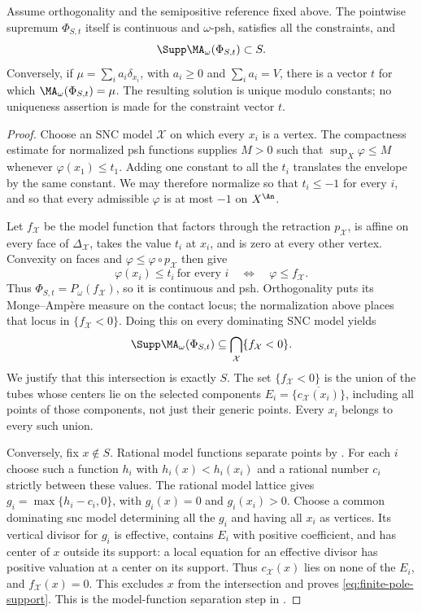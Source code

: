 \begin{proposition}
\label{prop:finite-pole-envelope}
Assume orthogonality and the semipositive reference fixed above.
The pointwise supremum $\Phi_{S,t}$ itself is continuous and
$\omega$-psh, satisfies all the constraints, and
\begin{equation}
                         \Supp\MA_\omega(\Phi_{S,t})\subset S.
\label{eq:finite-pole-support}
\end{equation}
Conversely, if
$\mu=\sum_i a_i\delta_{x_i}$, with $a_i\geq0$ and
$\sum_i a_i=V$, there is a vector $t$ for which
$\MA_\omega(\Phi_{S,t})=\mu$.  The resulting solution is unique modulo
constants; no uniqueness assertion is made for the constraint vector
$t$.
\end{proposition}

\begin{proof}
Choose an SNC model $\mathcal X$ on which every $x_i$ is a vertex.
The compactness estimate for normalized psh functions supplies $M>0$
such that $\sup_X\varphi\leq M$ whenever
$\varphi(x_1)\leq t_1$.  Adding one constant to all the $t_i$ translates
the envelope by the same constant.  We may therefore normalize so that
$t_i\leq-1$ for every $i$, and so that every admissible $\varphi$ is
at most $-1$ on $X^{\An}$.

Let $f_{\mathcal X}$ be the model function that factors through the
retraction $p_{\mathcal X}$, is affine on every face of
$\Delta_{\mathcal X}$, takes the value $t_i$ at $x_i$, and is zero
at every other vertex.  Convexity on faces and
$\varphi\leq\varphi\circ p_{\mathcal X}$ then give
\[
 \varphi(x_i)\leq t_i\ \text{for every }i
 \quad\Longleftrightarrow\quad
 \varphi\leq f_{\mathcal X}.
\]
Thus $\Phi_{S,t}=P_\omega(f_{\mathcal X})$, so it is continuous and
psh.  Orthogonality puts its Monge--Amp\`ere measure on the contact locus;
the normalization above places that locus in $\{f_{\mathcal X}<0\}$.
Doing this on every dominating SNC model yields
\[
 \Supp\MA_\omega(\Phi_{S,t})
 \subseteq\bigcap_{\mathcal X}\{f_{\mathcal X}<0\}.
\]
We justify that this intersection is exactly $S$.  The set
$\{f_{\mathcal X}<0\}$ is the union of the tubes whose centers lie on
the selected components $E_i=\overline{\{c_{\mathcal X}(x_i)\}}$,
including all points of those components, not just their generic points.
Every $x_i$ belongs to every such union.

Conversely, fix $x\notin S$.  Rational model functions separate points
by .  For each $i$ choose such a function
$h_i$ with $h_i(x)<h_i(x_i)$ and a rational number
$c_i$ strictly between these values.  The rational model lattice gives
$g_i=\max\{h_i-c_i,0\}$, with $g_i(x)=0$ and $g_i(x_i)>0$.
Choose a common dominating snc model determining all the $g_i$ and having
all $x_i$ as vertices.  Its vertical divisor for $g_i$ is effective,
contains $E_i$ with positive coefficient, and has center of $x$ outside
its support: a local equation for an effective divisor has positive
valuation at a center on its support.  Thus $c_{\mathcal X}(x)$ lies on
none of the $E_i$, and $f_{\mathcal X}(x)=0$.  This excludes $x$ from
the intersection and proves \eqref{eq:finite-pole-support}.  This is the
model-function separation step in \cite[Lemma~8.5]{BFJ15}.


\end{proof}
